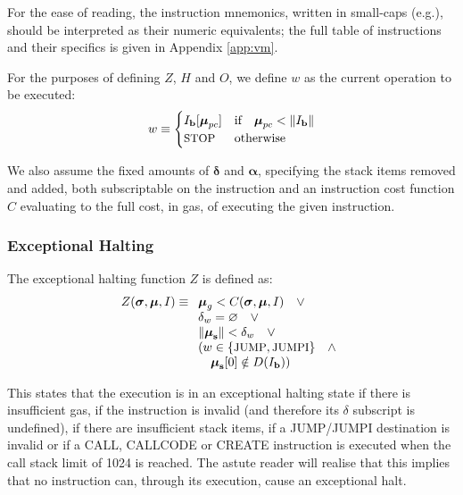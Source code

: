 \documentclass[9pt,oneside]{amsart}
\makeatletter
\newcommand*\eg{e.g.\@\xspace}
\makeatother
\begin{document}
\begin{multicols}{2}
For the ease of reading, the instruction mnemonics, written in small-caps (\eg {}), should be interpreted as their numeric equivalents; the full table of instructions and their specifics is given in Appendix \ref{app:vm}.

For the purposes of defining $Z$, $H$ and $O$, we define $w$ as the current operation to be executed:
\begin{equation}\label{eq:currentoperation}
w \equiv \begin{cases} I_\mathbf{b}[\boldsymbol{\mu}_{pc}] & \text{if} \quad \boldsymbol{\mu}_{pc} < \lVert I_\mathbf{b} \rVert \\
\text{\small STOP} & \text{otherwise}
\end{cases}
\end{equation}

We also assume the fixed amounts of $\mathbf{\delta}$ and $\mathbf{\alpha}$, specifying the stack items removed and added, both subscriptable on the instruction and an instruction cost function $C$ evaluating to the full cost, in gas, of executing the given instruction.

\subsubsection{Exceptional Halting}

The exceptional halting function $Z$ is defined as:
\begin{equation}
Z(\boldsymbol{\sigma}, \boldsymbol{\mu}, I) \equiv
\begin{array}[t]{l}
\boldsymbol{\mu}_g < C(\boldsymbol{\sigma}, \boldsymbol{\mu}, I) \quad \vee \\
\mathbf{\delta}_w = \varnothing \quad \vee \\
\lVert\boldsymbol{\mu}_\mathbf{s}\rVert < \mathbf{\delta}_w \quad \vee \\
( w \in \{ \text{\small JUMP}, \text{\small JUMPI} \} \quad \wedge \\ \quad \boldsymbol{\mu}_\mathbf{s}[0] \notin D(I_\mathbf{b}) ) \quad
\end{array}
\end{equation}

This states that the execution is in an exceptional halting state if there is insufficient gas, if the instruction is invalid (and therefore its $\delta$ subscript is undefined), if there are insufficient stack items, if a {\small JUMP}/{\small JUMPI} destination is invalid or if a {\small CALL}, {\small CALLCODE} or {\small CREATE} instruction is executed when the call stack limit of 1024 is reached. The astute reader will realise that this implies that no instruction can, through its execution, cause an exceptional halt.


\end{multicols}
\end{document}
